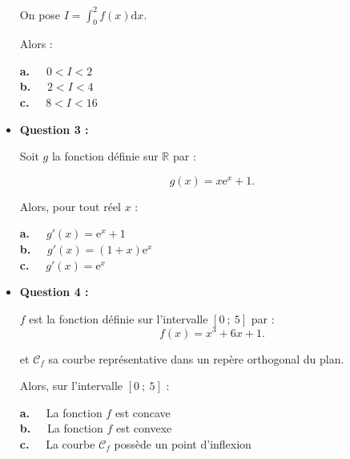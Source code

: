 \begin{itemize}
\begin{center}
\end{center}
     On pose $I= \displaystyle\int_{0}^{2}f(x)\text{d}x$.
     \par
     Alors :
     \par
     \textbf{a.~~} $0 < I < 2$ \\
     \textbf{b.~~} $2 < I < 4$ \\
     \textbf{c.~~} $8 < I < 16$ \\
     \item \textbf{Question 3 :}
     \par
     Soit $g$ la fonction définie sur $\mathbb{R}$ par :
     \par
     \[ g(x)=x \text{e}^{x}+1. \]
     \par
     Alors, pour tout réel $x$ :
     \par
     \textbf{a.~~} $g'(x)=\text{e}^{x}+1$ \\
     \textbf{b.~~} $g'(x)=(1+x)\text{e}^{x}$  \\
     \textbf{c.~~} $g'(x)=\text{e}^{x}$ \\
     \item \textbf{Question 4 :}
     \par
     $f$ est la fonction définie sur l'intervalle $[0~;~5]$ par :
     \[ f(x)=x^3+6x+1. \]
     \par
     et $\mathscr{C}_f$ sa courbe représentative dans un repère orthogonal du plan.
     \par
     Alors, sur l'intervalle $[0~;~5]$  :
     \par
     \textbf{a.~~} La fonction $f$ est concave \\
     \textbf{b.~~} La fonction $f$ est convexe \\
     \textbf{c.~~} La courbe $\mathscr{C}_f$ possède un point d'inflexion \\
     \par
\end{itemize}
